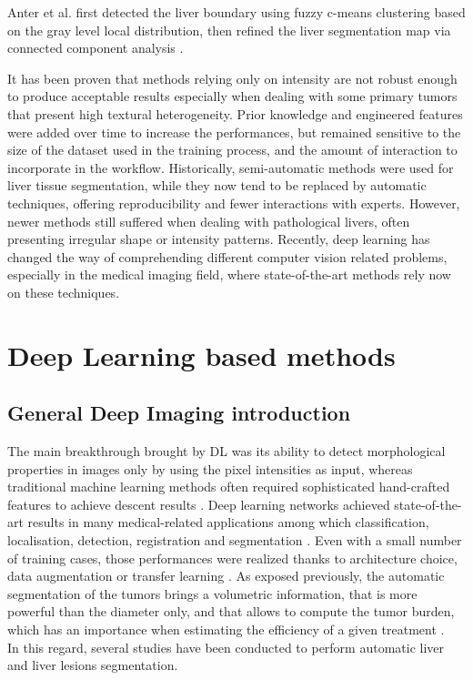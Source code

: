 \documentclass[]{article}
\begin{document}
Anter et al. first detected the liver boundary using fuzzy c-means
clustering based on the gray level local distribution, then refined the
liver segmentation map via connected component analysis \cite{Anter2014}.

It has been proven that methods relying only on intensity are not robust
enough to produce acceptable results especially when dealing with some
primary tumors that present high textural heterogeneity. Prior knowledge
and engineered features were added over time to increase the
performances, but remained sensitive to the size of the dataset used in
the training process, and the amount of interaction to incorporate in
the workflow.
Historically, semi-automatic methods were used for liver tissue
segmentation, while they now tend to be replaced by automatic
techniques, offering reproducibility and fewer interactions with
experts. However, newer methods still suffered when dealing with
pathological livers, often presenting irregular shape or intensity
patterns.
Recently, deep learning has changed the way of comprehending different
computer vision related problems, especially in the medical imaging
field, where state-of-the-art methods rely now on these techniques.


\section*{Deep Learning based methods}

\subsection*{General Deep Imaging introduction}

The main breakthrough brought by DL was its ability to detect
morphological properties in images only by using the pixel intensities
as input, whereas traditional machine learning methods often required
sophisticated hand-crafted features to achieve descent results \cite{Litjens2017, Suzuki2017}. Deep learning networks achieved
state-of-the-art results in many medical-related applications among
which classification, localisation, detection, registration and
segmentation \cite{Ker2017}. Even with a small number of
training cases, those performances were realized thanks to architecture
choice, data augmentation or transfer learning \cite{Zheng2018, Hu2018}.
As exposed previously, the automatic segmentation of the tumors brings a
volumetric information, that is more powerful than the diameter only,
and that allows to compute the tumor burden, which has an importance
when estimating the efficiency of a given treatment \cite{Gobbi2004, Bornemann2007, Heussel2007, Kuhnigk2006, Puesken2010, Bauknecht2010}.\\
In this regard, several studies have been conducted to perform automatic
liver and liver lesions segmentation.
\end{document}
